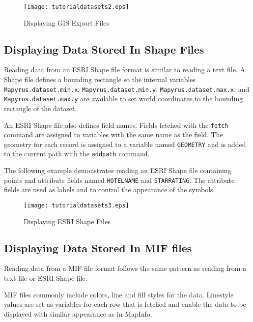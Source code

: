 

\begin{figure}[htb]
\texttt{[image: tutorialdatasets2.eps]}
\caption{Displaying GIS Export Files}
\label{tutorialdatasets2}
\end{figure}

\subsection{Displaying Data Stored In Shape Files}

Reading data from an ESRI Shape file format is similar to reading a text file.
A Shape file defines a bounding rectangle so the internal variables
\texttt{Mapyrus.dataset.min.x}, \texttt{Mapyrus.dataset.min.y},
\texttt{Mapyrus.dataset.max.x}, and \texttt{Mapyrus.dataset.max.y} are
available to set world coordinates to the bounding rectangle of the dataset.

An ESRI Shape file also defines field names.  Fields fetched with the
\texttt{fetch} command are assigned to variables with the same name as the
field.  The geometry for each record is assigned to a variable named
\texttt{GEOMETRY} and is added to the current path with the \texttt{addpath}
command.

The following example demonstrates reading an ESRI Shape file containing points
and attribute fields named \texttt{HOTELNAME} and \texttt{STARRATING}.  The
attribute fields are used as labels and to control the appearance of the
symbols.



\begin{figure}[htb]
\texttt{[image: tutorialdatasets3.eps]}
\caption{Displaying ESRI Shape Files}
\label{tutorialdatasets3}
\end{figure}

\subsection{Displaying Data Stored In MIF files}

Reading data from a MIF file format follows the same pattern as reading
from a text file or ESRI Shape file.

MIF files commonly include colors, line and fill styles for the data.
Linestyle values are set as variables
for each row that is fetched and enable the data to be displayed with
similar appearance as in MapInfo.

